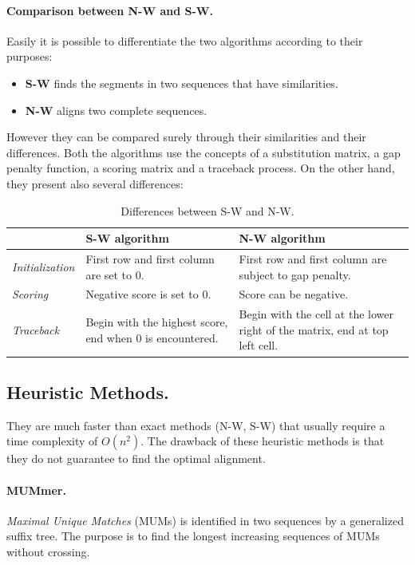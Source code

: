\paragraph*{Comparison between N-W and S-W.} Easily it is possible to differentiate the two algorithms according to their purposes:
\begin{itemize}
	\item \textbf{S-W} finds the segments in two sequences that have similarities.
	\item \textbf{N-W} aligns two complete sequences.
\end{itemize}
However they can be compared surely through their similarities and their differences. Both the algorithms use the concepts of a substitution matrix, a gap penalty function, a scoring matrix and a traceback process. On the other hand, they present also several differences:
\begin{table}[H]
	\centering
	\begin{tabular}{| p{2.5cm} | p{5.5cm} | p{5.5cm}|}
		\hline
		 & \textbf{S-W algorithm} & \textbf{N-W algorithm} \\
		 \hline
		 \textit{Initialization} & First row and first column are set to 0. & First row and first column are subject to gap penalty.\\
		 \hline
		 \textit{Scoring} & Negative score is set to 0. & Score can be negative. \\
		 \hline
		 \textit{Traceback} & Begin with the highest score, end when 0 is encountered. & Begin with the cell at the lower right of the matrix, end at top left cell.\\
		\hline
	\end{tabular}
	\caption{Differences between S-W and N-W.}
\end{table}

\subsection{Heuristic Methods.}
They are much faster than exact methods (N-W, S-W) that usually require a time complexity of $O(n^2)$. The drawback of these heuristic methods is that they do not guarantee to find the optimal alignment.

\paragraph*{MUMmer.} \textit{Maximal Unique Matches} (MUMs) is identified in two sequences by a generalized suffix tree. The purpose is to find the longest increasing sequences of MUMs without crossing.

